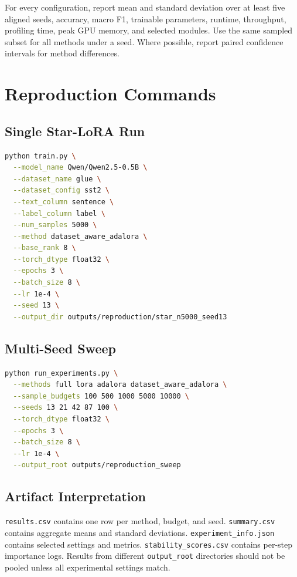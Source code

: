 For every configuration, report mean and standard deviation over at least five aligned seeds,
accuracy, macro F1, trainable parameters, runtime, throughput, profiling time, peak GPU memory, and
selected modules. Use the same sampled subset for all methods under a seed. Where possible, report
paired confidence intervals for method differences.

\chapter{Reproduction Commands}

\section{Single Star-LoRA Run}

\begin{lstlisting}[language=bash]
python train.py \
  --model_name Qwen/Qwen2.5-0.5B \
  --dataset_name glue \
  --dataset_config sst2 \
  --text_column sentence \
  --label_column label \
  --num_samples 5000 \
  --method dataset_aware_adalora \
  --base_rank 8 \
  --torch_dtype float32 \
  --epochs 3 \
  --batch_size 8 \
  --lr 1e-4 \
  --seed 13 \
  --output_dir outputs/reproduction/star_n5000_seed13
\end{lstlisting}

\section{Multi-Seed Sweep}

\begin{lstlisting}[language=bash]
python run_experiments.py \
  --methods full lora adalora dataset_aware_adalora \
  --sample_budgets 100 500 1000 5000 10000 \
  --seeds 13 21 42 87 100 \
  --torch_dtype float32 \
  --epochs 3 \
  --batch_size 8 \
  --lr 1e-4 \
  --output_root outputs/reproduction_sweep
\end{lstlisting}

\section{Artifact Interpretation}

\texttt{results.csv} contains one row per method, budget, and seed.
\texttt{summary.csv} contains aggregate means and standard deviations.
\texttt{experiment\_info.json} contains selected settings and metrics.
\texttt{stability\_scores.csv} contains per-step importance logs. Results from different
\texttt{output\_root} directories should not be pooled unless all experimental settings match.
